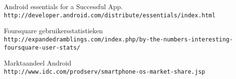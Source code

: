 \begin{thebibliography}{9}
Android essentials for a Successful App.
\\\texttt{http://developer.android.com/distribute/essentials/index.html}

Foursquare gebruikersstatistieken
\\\texttt{http://expandedramblings.com/index.php/by-the-numbers-interesting-foursquare-user-stats/}

Marktaandeel Android
\\\texttt{http://www.idc.com/prodserv/smartphone-os-market-share.jsp}


\end{thebibliography}





